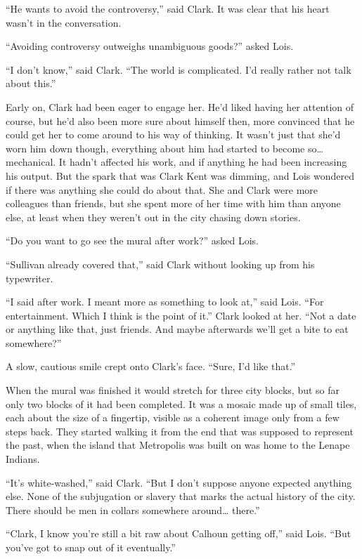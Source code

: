 \documentclass[ebook,12pt]{memoir}
\begin{document}
``He wants to avoid the controversy,'' said Clark. It was clear that his
heart wasn't in the conversation.

``Avoiding controversy outweighs unambiguous goods?'' asked Lois.

``I don't know,'' said Clark. ``The world is complicated. I'd really
rather not talk about this.''

Early on, Clark had been eager to engage her. He'd liked having her
attention of course, but he'd also been more sure about himself then,
more convinced that he could get her to come around to his way of
thinking. It wasn't just that she'd worn him down though, everything
about him had started to become so\ldots{} mechanical. It hadn't
affected his work, and if anything he had been increasing his output.
But the spark that was Clark Kent was dimming, and Lois wondered if
there was anything she could do about that. She and Clark were more
colleagues than friends, but she spent more of her time with him than
anyone else, at least when they weren't out in the city chasing down
stories.

``Do you want to go see the mural after work?'' asked Lois.

``Sullivan already covered that,'' said Clark without looking up from
his typewriter.

``I said after work. I meant more as something to look at,'' said Lois.
``For entertainment. Which I think is the point of it.'' Clark looked at
her. ``Not a date or anything like that, just friends. And maybe
afterwards we'll get a bite to eat somewhere?''

A slow, cautious smile crept onto Clark's face. ``Sure, I'd like that.''

When the mural was finished it would stretch for three city blocks, but
so far only two blocks of it had been completed. It was a mosaic made up
of small tiles, each about the size of a fingertip, visible as a
coherent image only from a few steps back. They started walking it from
the end that was supposed to represent the past, when the island that
Metropolis was built on was home to the Lenape Indians.

``It's white‐washed,'' said Clark. ``But I don't suppose anyone expected
anything else. None of the subjugation or slavery that marks the actual
history of the city. There should be men in collars somewhere
around\ldots{} there.''

``Clark, I know you're still a bit raw about Calhoun getting off,'' said
Lois. ``But you've got to snap out of it eventually.''
\end{document}
